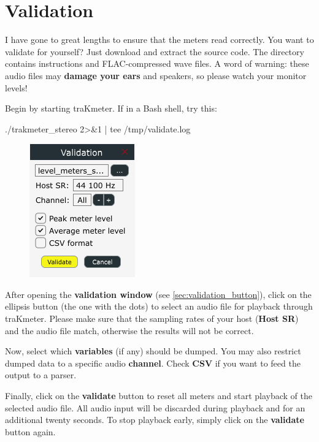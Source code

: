 \chapter{Validation}
\label{chap:validation}

I have gone to great lengths to ensure that the meters read correctly.
You want to validate for yourself?  Just download and extract the
source code.  The directory  contains instructions
and FLAC-compressed wave files.  A word of warning: these audio files
may \textbf{damage your ears} and speakers, so please watch your
monitor levels!

Begin by starting traKmeter.  If in a Bash shell, try this:

\begin{VerbatimBoth}
  ./trakmeter_stereo 2>&1 | tee /tmp/validate.log
\end{VerbatimBoth}

\begin{figure}
\includegraphics[scale=0.60,clip]{include/images/dialog_validation.png}
\end{figure}

After opening the \textbf{validation window} (see
\ref{sec:validation_button}), click on the ellipsis button (the one
with the dots) to select an audio file for playback through traKmeter.
Please make sure that the sampling rates of your host (\textbf{Host
  SR}) and the audio file match, otherwise the results will not be
correct.

Now, select which \textbf{variables} (if any) should be dumped.  You
may also restrict dumped data to a specific audio \textbf{channel}.
Check \textbf{CSV} if you want to feed the output to a parser.

Finally, click on the \textbf{validate} button to reset all meters and
start playback of the selected audio file.  All audio input will be
discarded during playback and for an additional twenty seconds.  To
stop playback early, simply click on the \textbf{validate} button
again.

